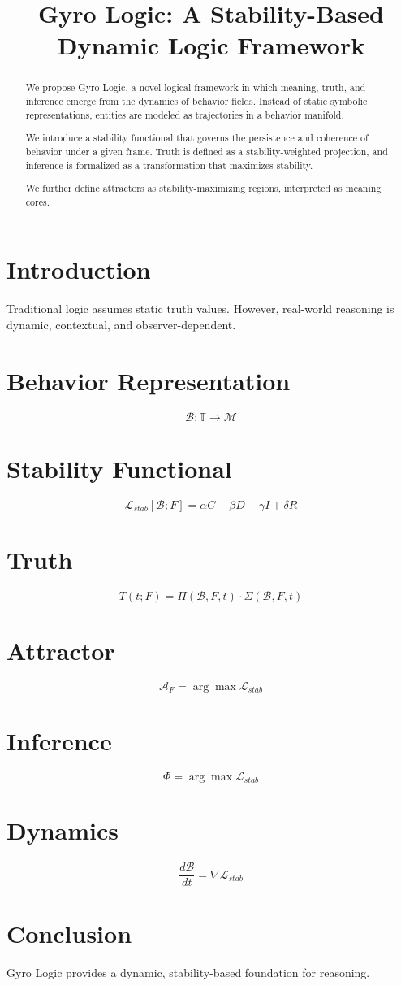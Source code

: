 \documentclass[11pt]{article}
\title{Gyro Logic: A Stability-Based Dynamic Logic Framework}
\author{}
\date{}
\begin{document}
\maketitle

\begin{abstract}
We propose Gyro Logic, a novel logical framework in which meaning,
truth, and inference emerge from the dynamics of behavior fields.
Instead of static symbolic representations, entities are modeled
as trajectories in a behavior manifold.

We introduce a stability functional that governs the persistence
and coherence of behavior under a given frame.
Truth is defined as a stability-weighted projection,
and inference is formalized as a transformation that maximizes stability.

We further define attractors as stability-maximizing regions,
interpreted as meaning cores.
\end{abstract}

\section{Introduction}

Traditional logic assumes static truth values.
However, real-world reasoning is dynamic, contextual, and observer-dependent.

\section{Behavior Representation}

\[
\mathcal{B} : \mathbb{T} \rightarrow \mathcal{M}
\]

\section{Stability Functional}

\[
\mathcal{L}_{stab}[\mathcal{B};F]
=
\alpha C - \beta D - \gamma I + \delta R
\]

\section{Truth}

\[
T(t;F)=\Pi(\mathcal{B},F,t)\cdot\Sigma(\mathcal{B},F,t)
\]

\section{Attractor}

\[
\mathcal{A}_F = \arg\max \mathcal{L}_{stab}
\]

\section{Inference}

\[
\Phi = \arg\max \mathcal{L}_{stab}
\]

\section{Dynamics}

\[
\frac{d\mathcal{B}}{dt} = \nabla \mathcal{L}_{stab}
\]

\section{Conclusion}

Gyro Logic provides a dynamic, stability-based foundation for reasoning.
\end{document}
